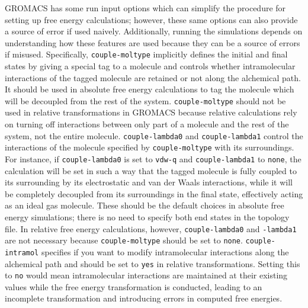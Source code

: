 \documentclass[journal=jctcce,manuscript=article]{achemso}
\newcommand{\inpopt}[1]{\texttt{#1}}
\begin{document}

GROMACS has some run input options which can simplify the procedure for setting up 
free energy calculations; however, these same options can also provide a source of error
if used naively. Additionally, running the simulations depends on understanding how these 
features are used because they can be a source of errors if misused. Specifically, 
\inpopt{couple-moltype} implicitly defines the initial and final states by giving a special tag
to a molecule and controls whether intramolecular interactions of the tagged molecule are 
retained or not along the alchemical path.
It should be used in absolute free energy calculations to tag the molecule which will be 
decoupled from the rest of the system. \inpopt{couple-moltype} should not be used in 
relative transformations in GROMACS because relative calculations rely on turning off 
interactions between only part of a molecule and the rest of the system, not the entire 
molecule. 
\inpopt{couple-lambda0} and \inpopt{couple-lambda1} control the interactions of the molecule
specified by \inpopt{couple-moltype} with its surroundings. For instance, if \inpopt{couple-lambda0}
is set to \inpopt{vdw-q} and \inpopt{couple-lambda1} to \inpopt{none}, the calculation will be set
in such a way that the tagged molecule is fully coupled to its surrounding by its electrostatic and
van der Waals interactions, while it will be completely decoupled from its surroundings in
the final state, effectively acting as an ideal gas molecule. These should be the default choices in
absolute free energy simulations; there is no need to specify both end states in the topology file.
In relative free energy calculations, however, \inpopt{couple-lambda0} and \inpopt{-lambda1} are
not necessary because \inpopt{couple-moltype} should be set to \inpopt{none}. 
\inpopt{couple-intramol} specifies if you want to modify intramolecular interactions along the alchemical 
path and should be set to \inpopt{yes} in relative transformations.
Setting this to \inpopt{no}
would mean intramolecular interactions are maintained at their existing values while the 
free energy transformation is conducted, leading to an incomplete transformation and introducing 
errors in computed free energies.
\end{document}

